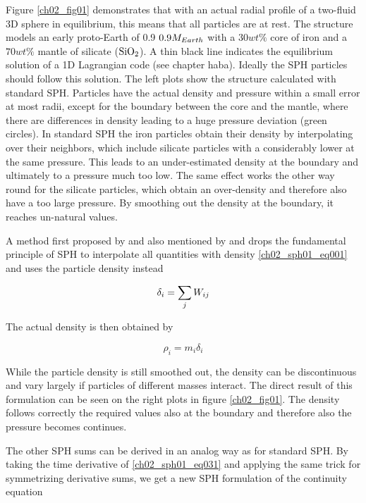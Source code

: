 Figure \ref{ch02_fig01} demonstrates that with an actual radial profile of a two-fluid 3D sphere in equilibrium, this means that all particles are at rest. The structure models an early proto-Earth of 0.9 $0.9 M_{Earth}$ with a $30 wt\%$ core of iron and a $70 wt\%$ mantle of silicate ($\mathrm{SiO}_2$). A thin black line indicates the equilibrium solution of a 1D Lagrangian code (see chapter haba). Ideally the SPH particles should follow this solution. The left plots show the structure calculated with standard SPH. Particles have the actual density and pressure within a small error at most radii, except for the boundary between the core and the mantle, where there are differences in density leading to a huge pressure deviation (green circles). In standard SPH the iron particles obtain their density by interpolating over their neighbors, which include silicate particles with a considerably lower at the same pressure. This leads to an under-estimated density at the boundary and ultimately to a pressure much too low. The same effect works the other way round for the silicate particles, which obtain an over-density and therefore also have a too large pressure.  By smoothing out the density at the boundary, it reaches un-natural values. 

A method first proposed by \citep{Ott:2003p3727} and also mentioned by \citep{Solenthaler:2008p3720} and \citep{Price:2004p2613} drops the fundamental principle of SPH to interpolate all quantities with density \ref{ch02_sph01_eq001} and uses the particle density instead 

\begin{equation}
\label{ch02_sph01_eq030}
\delta_i = \sum_{j} W_{ij}
\end{equation}

The actual density is then obtained by 

\begin{equation}
\label{ch02_sph01_eq031}
\rho_i = m_i \delta_i
\end{equation}

While the particle density is still smoothed out, the density can be discontinuous and vary largely if particles of different masses interact. The direct result of this formulation can be seen on the right plots in figure \ref{ch02_fig01}. The density follows correctly the required values also at the boundary and therefore also the pressure becomes continues. 

The other SPH sums can be derived in an analog way as for standard SPH. By taking the time derivative of \ref{ch02_sph01_eq031} and applying the same trick for symmetrizing derivative sums, we get a new SPH formulation of the continuity equation 

